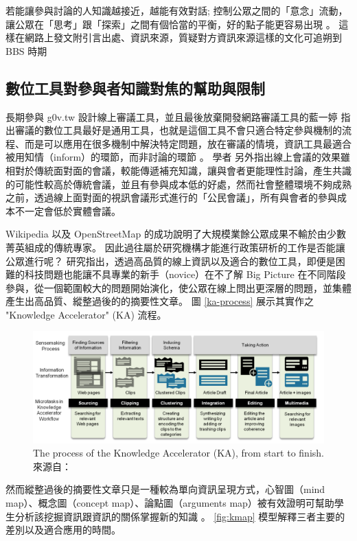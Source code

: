 \documentclass[12pt,a4paper]{article}
\begin{document}
若能讓參與討論的人知識越接近，越能有效對話; 控制公眾之間的「意念」流動，讓公眾在「思考」跟「探索」之間有個恰當的平衡，好的點子能更容易出現 \citep*{pentland14_shu}。 這樣在網路上發文附引言出處、資訊來源，質疑對方資訊來源這樣的文化可追朔到 BBS 時期 \citep*{malaita15}

\subsection{數位工具對參與者知識對焦的幫助與限制}
\label{sec:org0bb6b42}
長期參與 g0v.tw 設計線上審議工具，並且最後放棄開發網路審議工具的藍一婷
指出審議的數位工具最好是通用工具，也就是這個工具不會只適合特定參與機制的流程、而是可以應用在很多機制中解決特定問題，放在審議的情境，資訊工具最適合被用知情（inform）的環節，而非討論的環節 \citep{etblue18,etblue2017}。 學者 \citep*{chen08} 另外指出線上會議的效果雖相對於傳統面對面的會議，較能傳遞補充知識，讓與會者更能理性討論，產生共識的可能性較高於傳統會議，並且有參與成本低的好處，然而社會整體環境不夠成熟之前，透過線上面對面的視訊會議形式進行的「公民會議」，所有與會者的參與成本不一定會低於實體會議。

Wikipedia 以及 OpenStreetMap 的成功說明了大規模業餘公眾成果不輸於由少數菁英組成的傳統專家。
因此過往屬於研究機構才能進行政策研析的工作是否能讓公眾進行呢？ \citep*{hahn16} 研究指出，透過高品質的線上資訊以及適合的數位工具，即便是困難的科技問題也能讓不具專業的新手（novice）在不了解 Big Picture 在不同階段參與，從一個範圍較大的問題開始演化，使公眾在線上問出更深層的問題，並集體產生出高品質、縱整過後的的摘要性文章。 圖 \ref{ka-process} 展示其實作之 "Knowledge Accelerator" (KA) 流程。

\begin{figure}[htbp]
\centering
\includegraphics[width=.9\linewidth]{./images/ka-process.png}
\caption{\label{fig:org0f4b677}
The process of the Knowledge Accelerator (KA), from start to finish. 來源自： \citep{hahn16}}
\end{figure}

然而縱整過後的摘要性文章只是一種較為單向資訊呈現方式，心智圖（mind map）、概念圖（concept map）、論點圖（arguments map）被有效證明可幫助學生分析該挖掘資訊跟資訊的關係掌握新的知識 \citep*{davies10} 。 \ref{fig:kmap} 模型解釋三者主要的差別以及適合應用的時間。
\end{document}
